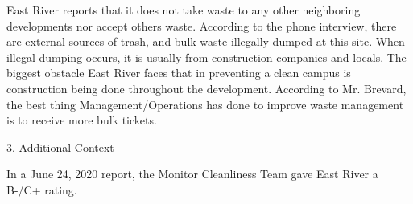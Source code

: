 East River reports that it does not take waste to any other neighboring developments nor accept others waste. According to the phone interview, there are external sources of trash, and bulk waste illegally dumped at this site. When illegal dumping occurs, it is usually from construction companies and locals. The biggest obstacle East River faces that in preventing a clean campus is construction being done throughout the development. According to Mr. Brevard, the best thing Management/Operations has done to improve waste management is to receive more bulk tickets.  

3. Additional Context

In a June 24, 2020 report, the Monitor Cleanliness Team gave East River a B-/C+ rating.